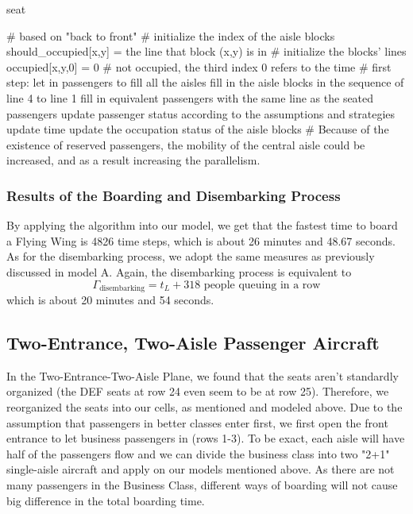 \documentclass{article}
\theoremstyle{definition}
\theoremstyle{remark}
\numberwithin{equation}{section}
\begin{document}
	\begin{algorithm}
		\caption{seat}
		\begin{algorithmic}
			\STATE \# based on "back to front"
			\STATE \# initialize the index of the aisle blocks
			\STATE should\_occupied[x,y] = the line that block (x,y) is in \# initialize the blocks' lines
			\STATE occupied[x,y,0] = 0 \# not occupied, the third index 0 refers to the time
			\STATE \# first step: let in passengers to fill all the aisles
			\ENDFOR
			\STATE fill in the aisle blocks in the sequence of line 4 to line 1
			\ENDWHILE
			\STATE fill in equivalent passengers with the same line as the seated passengers
			\ENDIF
			\STATE update passenger status according to the assumptions and strategies
			\STATE update time
			\STATE update the occupation status of the aisle blocks
			\STATE \# Because of the existence of reserved passengers, the mobility of the central aisle could be increased, and as a result increasing the parallelism.
			\ENDWHILE
		\end{algorithmic}
	\end{algorithm}

	\subsubsection{Results of the Boarding and Disembarking Process}
	By applying the algorithm into our model, we get that the fastest time to board a Flying Wing is 4826 time steps, which is about 26 minutes and 48.67 seconds. As for the disembarking process, we adopt the same measures as previously discussed in model A. Again, the disembarking process is equivalent to
	\[\Gamma_{\text{disembarking}}=t_L+\text{318 people queuing in a row}\]
	which is about 20 minutes and 54 seconds.

	\subsection{Two-Entrance, Two-Aisle Passenger Aircraft}
	In the Two-Entrance-Two-Aisle Plane, we found that the seats aren't standardly organized (the DEF seats at row 24 even seem to be at row 25). Therefore, we reorganized the seats into our cells, as mentioned and modeled above. Due to the assumption that passengers in better classes enter first, we first open the front entrance to let business passengers in (rows 1-3). To be exact, each aisle will have half of the passengers flow and we can divide the business class into two "2+1" single-aisle aircraft and apply on our models mentioned above. As there are not many passengers in the Business Class, different ways of boarding will not cause big difference in the total boarding time.
\end{document}
